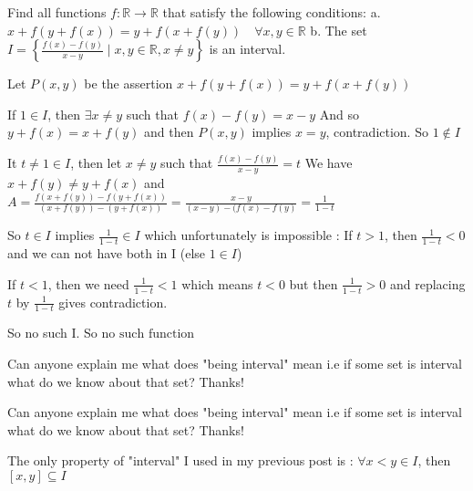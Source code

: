 \begin{solution}
	\begin{tcolorbox}Find all functions $f:\mathbb{R}\rightarrow \mathbb{R}$ that satisfy the following conditions:
a. $x+f(y+f(x))=y+f(x+f(y)) \quad \forall x,y \in \mathbb{R}$
b. The set $I=\left\{\frac{f(x)-f(y)}{x-y}\mid x,y\in \mathbb{R},x\neq y \right\}$ is an interval.\end{tcolorbox}
Let $P(x,y)$ be the assertion $x+f(y+f(x))=y+f(x+f(y))$

If $1\in I$, then $\exists x\ne y$ such that $f(x)-f(y)=x-y$
And so $y+f(x)=x+f(y)$ and then $P(x,y)$ implies $x=y$, contradiction.
So $1\notin I$

It $t\ne 1\in I$, then let $x\ne y$ such that $\frac{f(x)-f(y)}{x-y}=t$
We have $x+f(y)\ne y+f(x)$ and 
$A=\frac{f(x+f(y))-f(y+f(x))}{(x+f(y))-(y+f(x))}=\frac{x-y}{(x-y)-(f(x)-f(y)}=\frac 1{1-t}$

So $t\in I$ implies $\frac 1{1-t}\in I$ which unfortunately is impossible :
If $t>1$, then $\frac 1{1-t}<0$ and we can not have both in I (else $1\in I$)

If $t<1$, then we need $\frac 1{1-t}<1$ which means $t<0$ but then $\frac 1{1-t}>0$ and replacing $t$ by $\frac 1{1-t}$ gives contradiction.

So no such I.
So $\boxed{\text{no such function}}$


\end{solution}



\begin{solution}
	Can anyone explain me what does "being interval" mean i.e if some set is interval what do we know about that set?
Thanks!
\end{solution}



\begin{solution}
	\begin{tcolorbox}Can anyone explain me what does "being interval" mean i.e if some set is interval what do we know about that set?
Thanks!\end{tcolorbox}
The only property of "interval" I used in my previous post is : $\forall x<y\in I$, then $[x,y]\subseteq I$


\end{solution}



